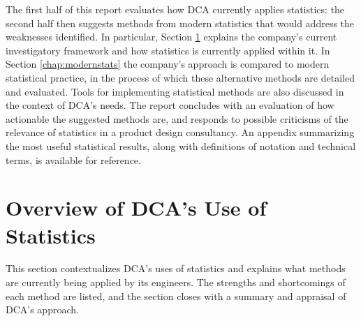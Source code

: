 \documentclass[11pt,a4paper,article]{memoir} %
\begin{document}
\par
The first half of this report evaluates how DCA currently applies statistics: the second half then suggests methods from modern statistics that would address the weaknesses identified. In particular, Section \ref{chap:dca} explains the company's current investigatory framework and how statistics is currently applied within it. In Section \ref{chap:modernstats} the company's approach is compared to modern statistical practice, in the process of which these alternative methods are detailed and evaluated. Tools for implementing statistical methods are also discussed in the context of DCA's needs. The report concludes with an evaluation of how actionable the suggested methods are, and responds to possible criticisms of the relevance of statistics in a product design consultancy. An appendix summarizing the most useful statistical results, along with definitions of notation and technical terms, is available for reference.

\newpage



\chapter {Overview of DCA's Use of Statistics}
\label{chap:dca}
This section contextualizes DCA's uses of statistics and explains what methods are currently being applied by its engineers. The strengths and shortcomings of each method are listed, and the section closes with a summary and appraisal of DCA's approach.
\end{document}
